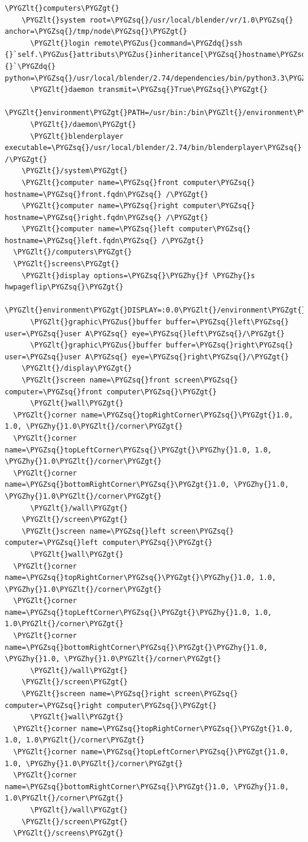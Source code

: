 \documentclass[a4,10pt,openany,oneside]{sphinxmanual}
\def\PYGZus{\char`\_}
\def\PYGZlt{\char`\<}
\def\PYGZgt{\char`\>}
\def\PYGZhy{\char`\-}
\def\PYGZsq{\char`\'}
\def\PYGZdq{\char`\"}
\begin{document}
\begin{Verbatim}[commandchars=\\\{\}]
  \PYGZlt{}computers\PYGZgt{}
    \PYGZlt{}system root=\PYGZsq{}/usr/local/blender/vr/1.0\PYGZsq{} anchor=\PYGZsq{}/tmp/node\PYGZsq{}\PYGZgt{}
      \PYGZlt{}login remote\PYGZus{}command=\PYGZdq{}ssh {}`self.\PYGZus{}attributs\PYGZus{}inheritance[\PYGZsq{}hostname\PYGZsq{}]{}`\PYGZdq{} python=\PYGZsq{}/usr/local/blender/2.74/dependencies/bin/python3.3\PYGZsq{}/\PYGZgt{}
      \PYGZlt{}daemon transmit=\PYGZsq{}True\PYGZsq{}\PYGZgt{}
  \PYGZlt{}environment\PYGZgt{}PATH=/usr/bin:/bin\PYGZlt{}/environment\PYGZgt{}
      \PYGZlt{}/daemon\PYGZgt{}
      \PYGZlt{}blenderplayer executable=\PYGZsq{}/usr/local/blender/2.74/bin/blenderplayer\PYGZsq{} /\PYGZgt{}
    \PYGZlt{}/system\PYGZgt{}
    \PYGZlt{}computer name=\PYGZsq{}front computer\PYGZsq{} hostname=\PYGZsq{}front.fqdn\PYGZsq{} /\PYGZgt{}
    \PYGZlt{}computer name=\PYGZsq{}right computer\PYGZsq{} hostname=\PYGZsq{}right.fqdn\PYGZsq{} /\PYGZgt{}
    \PYGZlt{}computer name=\PYGZsq{}left computer\PYGZsq{} hostname=\PYGZsq{}left.fqdn\PYGZsq{} /\PYGZgt{}
  \PYGZlt{}/computers\PYGZgt{}
  \PYGZlt{}screens\PYGZgt{}
    \PYGZlt{}display options=\PYGZsq{}\PYGZhy{}f \PYGZhy{}s hwpageflip\PYGZsq{}\PYGZgt{}
      \PYGZlt{}environment\PYGZgt{}DISPLAY=:0.0\PYGZlt{}/environment\PYGZgt{}
      \PYGZlt{}graphic\PYGZus{}buffer buffer=\PYGZsq{}left\PYGZsq{} user=\PYGZsq{}user A\PYGZsq{} eye=\PYGZsq{}left\PYGZsq{}/\PYGZgt{}
      \PYGZlt{}graphic\PYGZus{}buffer buffer=\PYGZsq{}right\PYGZsq{} user=\PYGZsq{}user A\PYGZsq{} eye=\PYGZsq{}right\PYGZsq{}/\PYGZgt{}
    \PYGZlt{}/display\PYGZgt{}
    \PYGZlt{}screen name=\PYGZsq{}front screen\PYGZsq{} computer=\PYGZsq{}front computer\PYGZsq{}\PYGZgt{}
      \PYGZlt{}wall\PYGZgt{}
  \PYGZlt{}corner name=\PYGZsq{}topRightCorner\PYGZsq{}\PYGZgt{}1.0, 1.0, \PYGZhy{}1.0\PYGZlt{}/corner\PYGZgt{}
  \PYGZlt{}corner name=\PYGZsq{}topLeftCorner\PYGZsq{}\PYGZgt{}\PYGZhy{}1.0, 1.0, \PYGZhy{}1.0\PYGZlt{}/corner\PYGZgt{}
  \PYGZlt{}corner name=\PYGZsq{}bottomRightCorner\PYGZsq{}\PYGZgt{}1.0, \PYGZhy{}1.0, \PYGZhy{}1.0\PYGZlt{}/corner\PYGZgt{}
      \PYGZlt{}/wall\PYGZgt{}
    \PYGZlt{}/screen\PYGZgt{}
    \PYGZlt{}screen name=\PYGZsq{}left screen\PYGZsq{} computer=\PYGZsq{}left computer\PYGZsq{}\PYGZgt{}
      \PYGZlt{}wall\PYGZgt{}
  \PYGZlt{}corner name=\PYGZsq{}topRightCorner\PYGZsq{}\PYGZgt{}\PYGZhy{}1.0, 1.0, \PYGZhy{}1.0\PYGZlt{}/corner\PYGZgt{}
  \PYGZlt{}corner name=\PYGZsq{}topLeftCorner\PYGZsq{}\PYGZgt{}\PYGZhy{}1.0, 1.0, 1.0\PYGZlt{}/corner\PYGZgt{}
  \PYGZlt{}corner name=\PYGZsq{}bottomRightCorner\PYGZsq{}\PYGZgt{}\PYGZhy{}1.0, \PYGZhy{}1.0, \PYGZhy{}1.0\PYGZlt{}/corner\PYGZgt{}
      \PYGZlt{}/wall\PYGZgt{}
    \PYGZlt{}/screen\PYGZgt{}
    \PYGZlt{}screen name=\PYGZsq{}right screen\PYGZsq{} computer=\PYGZsq{}right computer\PYGZsq{}\PYGZgt{}
      \PYGZlt{}wall\PYGZgt{}
  \PYGZlt{}corner name=\PYGZsq{}topRightCorner\PYGZsq{}\PYGZgt{}1.0, 1.0, 1.0\PYGZlt{}/corner\PYGZgt{}
  \PYGZlt{}corner name=\PYGZsq{}topLeftCorner\PYGZsq{}\PYGZgt{}1.0, 1.0, \PYGZhy{}1.0\PYGZlt{}/corner\PYGZgt{}
  \PYGZlt{}corner name=\PYGZsq{}bottomRightCorner\PYGZsq{}\PYGZgt{}1.0, \PYGZhy{}1.0, 1.0\PYGZlt{}/corner\PYGZgt{}
      \PYGZlt{}/wall\PYGZgt{}
    \PYGZlt{}/screen\PYGZgt{}
  \PYGZlt{}/screens\PYGZgt{}


\end{Verbatim}
\end{document}
